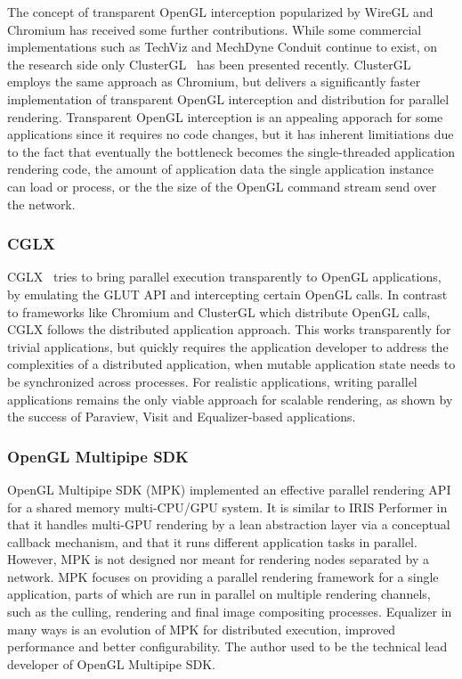 The concept of transparent OpenGL interception popularized by WireGL and
Chromium has received some further contributions. While some commercial
implementations such as {TechViz} and {MechDyne Conduit} continue to exist, on
the research side only {ClusterGL}~\cite{NHM:11} has been presented recently.
{ClusterGL} employs the same approach as {Chromium}, but delivers a
significantly faster implementation of transparent OpenGL interception and
distribution for parallel rendering. Transparent OpenGL interception is an
appealing apporach for some applications since it requires no code changes, but
it has inherent limitiations due to the fact that eventually the bottleneck
becomes the single-threaded application rendering code, the amount of
application data the single application instance can load or process, or the the
size of the OpenGL command stream send over the network.

\subsubsection{CGLX}

{CGLX}~\cite{DK:11} tries to bring parallel execution transparently to OpenGL
applications, by emulating the GLUT API and intercepting certain OpenGL calls.
In contrast to frameworks like {Chromium} and {ClusterGL} which distribute
OpenGL calls, {CGLX} follows the distributed application approach. This works
transparently for trivial applications, but quickly requires the application
developer to address the complexities of a distributed application, when
mutable application state needs to be synchronized across processes. For
realistic applications, writing parallel applications remains the only viable
approach for scalable rendering, as shown by the success of {Paraview}, {Visit}
and {Equalizer}-based applications.

\subsubsection{OpenGL Multipipe SDK}

OpenGL Multipipe SDK (MPK) \cite{BRE:05} implemented an effective parallel
rendering API for a shared memory multi-CPU/GPU system. It is similar to IRIS
Performer \cite{RH:94} in that it handles multi-GPU rendering by a lean
abstraction layer via a conceptual callback mechanism, and that it runs
different application tasks in parallel. However, MPK is not designed nor meant
for rendering nodes separated by a network. MPK focuses on providing a parallel
rendering framework for a single application, parts of which are run in
parallel on multiple rendering channels, such as the culling, rendering and
final image compositing processes. Equalizer in many ways is an evolution of
MPK for distributed execution, improved performance and better configurability.
The author used to be the technical lead developer of OpenGL Multipipe SDK.

